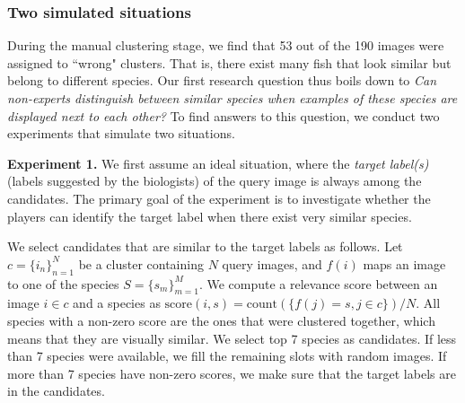 
\subsubsection{Two simulated situations}
During the manual clustering stage, we find that 53 out of the 190 images 
were assigned to ``wrong" clusters. %
That is, there exist many fish that look similar but belong to different species. 
Our first research question thus boils down to
\emph{Can non-experts distinguish between similar species when examples of these species are displayed
next to each other?}
To find answers to this question, we conduct two experiments that simulate two situations. 
%

\noindent
\textbf{Experiment 1.}
We first assume an ideal situation, where the \emph{target label(s)} (labels suggested by the biologists) 
of the query image is always among the candidates.
The primary goal of the experiment is to investigate whether the players can identify
the target label when there exist very similar species.

We select candidates that are similar to the target labels as follows.
Let $c=\{i_n\}_{n=1}^N$ be a cluster containing $N$ query images, and $f(i)$ maps an image
to one of the species $S=\{s_m\}_{m=1}^M$.
We compute a relevance score between an image $i \in c$ and a species as
$\text{score}(i, s) = \text{count}(\{f(j) = s, j \in c\})/N$.
All species with a non-zero score are the ones that were clustered together, which means
that they are visually similar. We select top 7 species as candidates.
If less than 7 species were available, we fill the remaining slots with random images.
If more than 7 species have non-zero scores, 
we make sure that the target labels are in the candidates.
%

